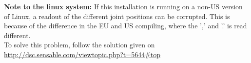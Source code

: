 \textbf{Note to the linux system:} If this installation is running on a non-US version of Linux, a readout of the different joint positions can be corrupted. This is because of the difference in the EU and US compiling, where the ',' and '.' is read different.\\
To solve this problem, follow the solution given on\\
\url{http://dsc.sensable.com/viewtopic.php?t=5644#top} 



